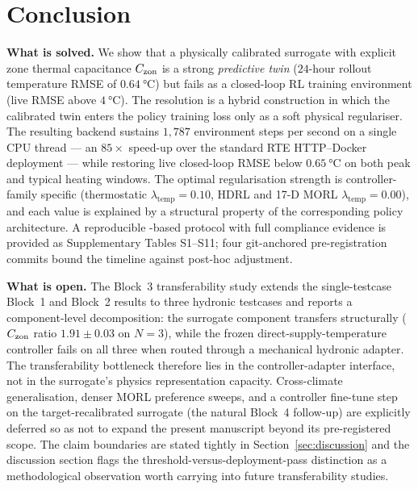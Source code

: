 \section{Conclusion}
\label{sec:conclusion}

\textbf{What is solved.} We show that a physically calibrated surrogate
with explicit zone thermal capacitance $C_{\mathrm{zon}}$ is a strong
\emph{predictive twin} ($24$-hour rollout temperature RMSE of
$\SI{0.64}{\celsius}$) but fails as a closed-loop RL training
environment (live RMSE above $\SI{4}{\celsius}$). The resolution is a
hybrid construction in which the calibrated twin enters the policy
training loss only as a soft physical regulariser. The resulting
backend sustains $1{,}787$ environment steps per second on a single
CPU thread --- an $85\times$ speed-up over the standard \boptest{}
RTE HTTP--Docker deployment --- while restoring live closed-loop RMSE
below $\SI{0.65}{\celsius}$ on both peak and typical heating windows.
The optimal regularisation strength is controller-family specific
(thermostatic $\lambda_{\mathrm{temp}}=0.10$,
HDRL and 17-D MORL $\lambda_{\mathrm{temp}}=0.00$), and each value
is explained by a structural property of the corresponding policy
architecture. A reproducible \boptest-based protocol with full
\cite{HouEvins2024} compliance evidence is provided as Supplementary
Tables S1--S11; four git-anchored pre-registration commits bound the
timeline against post-hoc adjustment.

\textbf{What is open.} The Block~3 transferability study extends the
single-testcase Block~1 and Block~2 results to three \boptest{}
hydronic testcases and reports a component-level decomposition: the
surrogate component transfers structurally ($C_{\mathrm{zon}}$ ratio
$1.91\pm0.03$ on $N=3$), while the frozen direct-supply-temperature
controller fails on all three when routed through a mechanical
hydronic adapter. The transferability bottleneck therefore lies in
the controller-adapter interface, not in the surrogate's physics
representation capacity. Cross-climate generalisation, denser MORL
preference sweeps, and a controller fine-tune step on the
target-recalibrated surrogate (the natural Block~4 follow-up) are
explicitly deferred so as not to expand the present manuscript beyond
its pre-registered scope. The claim boundaries are stated tightly in
Section~\ref{sec:discussion} and the discussion section flags the
threshold-versus-deployment-pass distinction as a methodological
observation worth carrying into future transferability studies.
